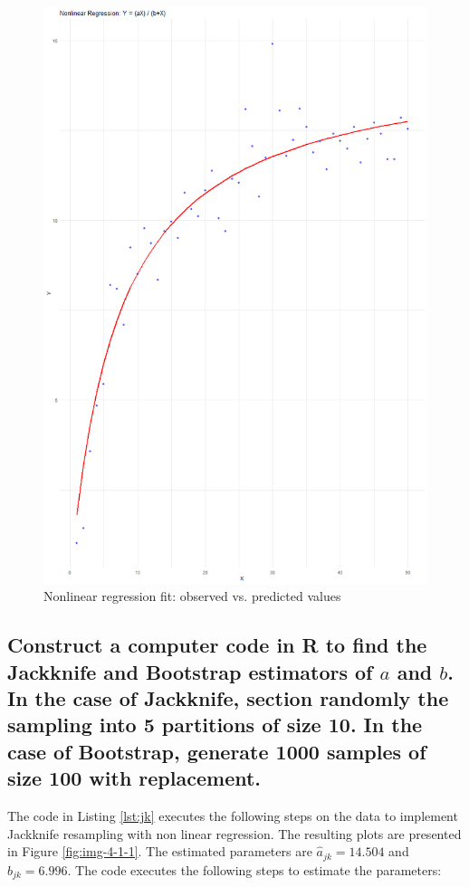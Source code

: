 \documentclass[]{article}
\begin{document}
\begin{figure}[H]
	\centering
	\includegraphics[width=0.7\linewidth]{img/img-4-1}
	\caption{Nonlinear regression fit: observed vs. predicted values}
	\label{fig:img-4-1}
\end{figure}


\subsection{Construct a computer code in R to find the Jackknife and Bootstrap estimators of $a$ and $b$. In the 
	case of Jackknife, section randomly the sampling into 5 partitions of size 10. In the case of 
	Bootstrap, generate 1000 samples of size 100 with replacement. }



The code in Listing \ref{lst:jk} executes the following steps on the data to implement Jackknife resampling with non linear regression. The resulting plots are presented in Figure \ref{fig:img-4-1-1}. The estimated parameters are $\hat{a}_{jk} = 14.504$ and $\hat{b}_{jk} = 6.996$. The code executes the following steps to estimate the parameters:
\end{document}
